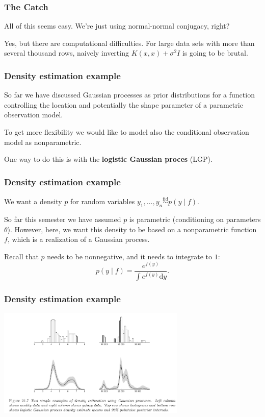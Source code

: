 \documentclass{beamer}
\begin{document}
\begin{frame}
\frametitle{The Catch}

All of this seems easy. We're just using normal-normal conjugacy, right?
\newline
\pause

Yes, but there are computational difficulties. For large data sets with more than several thousand rows, naively inverting $K(x,x) + \sigma^2I$ is going to be brutal.

\end{frame}

\begin{frame}
\frametitle{Density estimation example}

So far we have discussed Gaussian processes as prior distributions for a function controlling
the location and potentially the shape parameter of a parametric observation model. 
\pause
\newline


To get more flexibility we would like to model also the conditional observation model as nonparametric.
\newline

One way to do this is with the {\bf logistic Gaussian proces} (LGP).
\end{frame}


\begin{frame}
\frametitle{Density estimation example}

We want a density $p$ for random variables $y_1, \ldots, y_n \overset{\text{iid}}{\sim} p(y \mid f)$. 
\newline

So far this semester we have assumed $p$ is parametric (conditioning on parameters $\theta$). However, here, we want this density to be based on a nonparametric function $f$, which is a realization of a Gaussian process.
\newline
\pause

Recall that $p$ needs to be nonnegative, and it needs to integrate to $1$:
$$
p(y \mid f) = \frac{e^{f(y)} }{ \int e^{f(y)} \text{d}y }.
$$

\end{frame}

\begin{frame}
\frametitle{Density estimation example}

\begin{center}
\includegraphics[width=90mm]{density_est.png}
\end{center}

\end{frame}
\end{document}
